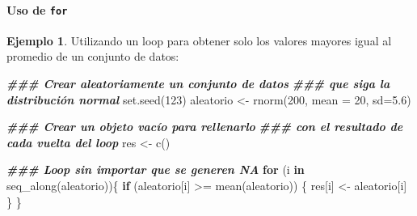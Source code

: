 \documentclass[
]{article}
\newenvironment{Shaded}{\begin{snugshade}}{\end{snugshade}}
\newcommand{\AttributeTok}[1]{\textcolor[rgb]{0.77,0.63,0.00}{#1}}
\newcommand{\ControlFlowTok}[1]{\textcolor[rgb]{0.13,0.29,0.53}{\textbf{#1}}}
\newcommand{\DecValTok}[1]{\textcolor[rgb]{0.00,0.00,0.81}{#1}}
\newcommand{\DocumentationTok}[1]{\textcolor[rgb]{0.56,0.35,0.01}{\textbf{\textit{#1}}}}
\newcommand{\FloatTok}[1]{\textcolor[rgb]{0.00,0.00,0.81}{#1}}
\newcommand{\FunctionTok}[1]{\textcolor[rgb]{0.00,0.00,0.00}{#1}}
\newcommand{\NormalTok}[1]{#1}
\newcommand{\OtherTok}[1]{\textcolor[rgb]{0.56,0.35,0.01}{#1}}
\newcommand{\SpecialCharTok}[1]{\textcolor[rgb]{0.00,0.00,0.00}{#1}}
\theoremstyle{definition}
\theoremstyle{definition}
\newtheorem{example}{Ejemplo}[section]
\theoremstyle{definition}
\theoremstyle{definition}
\theoremstyle{remark}
\begin{document}
\hypertarget{uso-de-for}{%
\paragraph{\texorpdfstring{Uso de \texttt{for}}{Uso de for}}\label{uso-de-for}}

\begin{example}

Utilizando un loop para obtener solo los valores mayores igual al promedio de un conjunto de datos:

\begin{Shaded}
\begin{Highlighting}[]
\DocumentationTok{\#\#\# Crear aleatoriamente un conjunto de datos }
\DocumentationTok{\#\#\# que siga la distribución normal}
\FunctionTok{set.seed}\NormalTok{(}\DecValTok{123}\NormalTok{)}
\NormalTok{aleatorio }\OtherTok{\textless{}{-}} \FunctionTok{rnorm}\NormalTok{(}\DecValTok{200}\NormalTok{, }\AttributeTok{mean =} \DecValTok{20}\NormalTok{, }\AttributeTok{sd=}\FloatTok{5.6}\NormalTok{)}

\DocumentationTok{\#\#\# Crear un objeto vacío para rellenarlo}
\DocumentationTok{\#\#\# con el resultado de cada vuelta del loop}
\NormalTok{res }\OtherTok{\textless{}{-}} \FunctionTok{c}\NormalTok{()}

\DocumentationTok{\#\#\# Loop sin importar que se generen NA}
\ControlFlowTok{for}\NormalTok{ (i }\ControlFlowTok{in} \FunctionTok{seq\_along}\NormalTok{(aleatorio))\{}
  \ControlFlowTok{if}\NormalTok{ (aleatorio[i] }\SpecialCharTok{\textgreater{}=} \FunctionTok{mean}\NormalTok{(aleatorio)) \{}
\NormalTok{    res[i] }\OtherTok{\textless{}{-}}\NormalTok{ aleatorio[i]}
\NormalTok{  \}}
\NormalTok{\}}


\end{Highlighting}
\end{Shaded}
\end{example}
\end{document}
